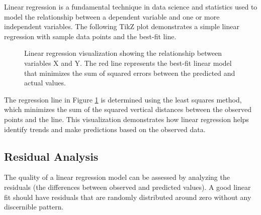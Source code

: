 \documentclass[12pt,a4paper,twoside]{article}
\theoremstyle{definition}
\begin{document}
Linear regression is a fundamental technique in data science and statistics used to model the relationship between a dependent variable and one or more independent variables. The following TikZ plot demonstrates a simple linear regression with sample data points and the best-fit line.

\begin{figure}[H]
\centering
{}
\caption{Linear regression visualization showing the relationship between variables X and Y. The red line represents the best-fit linear model that minimizes the sum of squared errors between the predicted and actual values.}
\label{fig:linear_regression}
\end{figure}

The regression line in Figure \ref{fig:linear_regression} is determined using the least squares method, which minimizes the sum of the squared vertical distances between the observed points and the line. This visualization demonstrates how linear regression helps identify trends and make predictions based on the observed data.

\subsection{Residual Analysis}

The quality of a linear regression model can be assessed by analyzing the residuals (the differences between observed and predicted values). A good linear fit should have residuals that are randomly distributed around zero without any discernible pattern.
\end{document}
